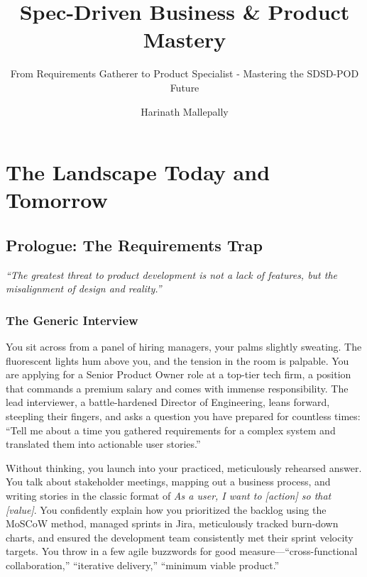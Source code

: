\documentclass[
  11pt,
  openany,
  oneside]{book}
\title{Spec-Driven Business \& Product Mastery}
\subtitle{From Requirements Gatherer to Product Specialist - Mastering
the SDSD-POD Future}
\author{Harinath Mallepally}
\date{}
\renewenvironment{quote}{\begin{customquote}}{\end{customquote}}
\begin{document}
\frontmatter
\maketitle

{
\setcounter{tocdepth}{1}
\tableofcontents
}
\mainmatter
\part{The Landscape Today and Tomorrow}

\chapter*{Prologue: The Requirements
Trap}\label{prologue-the-requirements-trap}

\begin{quote}
\emph{``The greatest threat to product development is not a lack of
features, but the misalignment of design and reality.''}
\end{quote}

\section{The Generic Interview}\label{the-generic-interview}

You sit across from a panel of hiring managers, your palms slightly
sweating. The fluorescent lights hum above you, and the tension in the
room is palpable. You are applying for a Senior Product Owner role at a
top-tier tech firm, a position that commands a premium salary and comes
with immense responsibility. The lead interviewer, a battle-hardened
Director of Engineering, leans forward, steepling their fingers, and
asks a question you have prepared for countless times: ``Tell me about a
time you gathered requirements for a complex system and translated them
into actionable user stories.''

Without thinking, you launch into your practiced, meticulously rehearsed
answer. You talk about stakeholder meetings, mapping out a business
process, and writing stories in the classic format of \emph{As a user, I
want to {[}action{]} so that {[}value{]}}. You confidently explain how
you prioritized the backlog using the MoSCoW method, managed sprints in
Jira, meticulously tracked burn-down charts, and ensured the development
team consistently met their sprint velocity targets. You throw in a few
agile buzzwords for good measure---``cross-functional collaboration,''
``iterative delivery,'' ``minimum viable product.''
\end{document}
